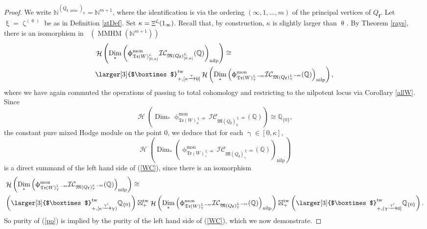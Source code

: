 \documentclass[a4paper,10pt]{amsart}
\newcommand{\ff}{\mathbf{f}}
\newcommand{\Boxtimes}{\mbox{\larger[3]{$\boxtimes$}}}
\newcommand{\WWW}{\mathfrak{Tr}(W)}
\newcommand{\Mst}{\mathfrak{M}}
\newcommand{\ICS}{\mathcal{IC}}
\newcommand{\phim}[1]{\phi^{\mon}_{#1}}
\renewcommand{\theta}{\uptheta}
\renewcommand{\gamma}{\upgamma}
\renewcommand{\zeta}{\upzeta}
\renewcommand{\xi}{\upxi}
\renewcommand{\phi}{\upphi}
\DeclareMathOperator{\sst}{-ss}
\DeclareMathOperator{\nilp}{nilp}
\DeclareMathOperator{\Dim}{Dim}
\DeclareMathOperator{\tw}{tw}
\DeclareMathOperator{\mon}{mon}
\DeclareMathOperator{\Mu}{\Upxi}
\DeclareMathOperator{\MMHM}{MMHM}
\DeclareMathOperator{\princ}{princ}
\DeclareMathOperator{\Ss}{\overline{s}}
\DeclareMathOperator{\Ho}{\mathcal{H}}
\DeclareMathOperator{\Dulf}{\mathcal{D}^{\geq, lf}}
\begin{document}
\begin{proof}
We write $\mathbb{N}^{(Q_{\ff,\princ})_0}=\mathbb{N}^{m+1}$, where the identification is via the ordering $(\infty,1,\ldots,m)$ of the principal vertices of $Q_{\ff}$.  Let $\xi=\zeta_{\Ss}^{(\theta_{\Ss})}$ be as in Definition \ref{ztDef}.  Set $\kappa=\Mu^{\xi}(1_\infty)$.  Recall that, by construction, $\kappa$ is slightly larger than $\theta_{\Ss}$.  By Theorem \ref{rays}, there is an isomorphism in $\Dulf(\MMHM(\mathbb{N}^{m+1}))$
\begin{align}
\label{WC}
&\Ho\left(\Dim_*\left(\phim{\WWW^{\xi}_{[0,\kappa]}}\ICS_{\Mst(Q_{\ff})_{[0,\kappa]}^{\xi}}(\mathbb{Q})\right)_{\nilp}\right)\cong\\&\Boxtimes_{+,[\kappa\xrightarrow{\gamma}0]}^{\tw}\Ho\left(\Dim_*\left(\phim{\WWW_{\gamma}^{\xi\sst}}\ICS_{\Mst(Q_{\ff})_{\gamma}^{\xi\sst}}(\mathbb{Q})\right)_{\nilp}\right),\nonumber
\end{align}
where we have again commuted the operations of passing to total cohomology and restricting to the nilpotent locus via Corollary \ref{allW}.  Since 
\[
\Ho\left(\Dim_*\phim{\WWW_{0}^{\xi\sst}}\ICS_{\Mst(Q_{\ff})_{0}^{\xi\sst}}(\mathbb{Q})\right)\cong\mathbb{Q}_{\{0\}},
\]
the constant pure mixed Hodge module on the point $0$, we deduce that for each $\gamma\in[0,\kappa]$,
\begin{equation}
\label{po}
\Ho\left(\Dim_*\left(\phim{\WWW_{\gamma}^{\xi\sst}}\ICS_{\Mst(Q_{\ff})_{\gamma}^{\xi\sst}}(\mathbb{Q})\right)_{\nilp}\right)
\end{equation} 
is a direct summand of the left hand side of (\ref{WC}), since there is an isomorphism
\begin{align*}
&\Ho\left(\Dim_*\left(\phim{\WWW_{\gamma}^{\xi\sst}}\ICS_{\Mst(Q_{\ff})_{\gamma}^{\xi\sst}}(\mathbb{Q})\right)_{\nilp}\right)\cong \\&\left(\Boxtimes^{\tw}_{+,[\kappa\xrightarrow{\gamma'}\gamma)}\mathbb{Q}_{\{0\}}\right)\boxtimes_+^{\tw}\Ho\left(\Dim_*\left(\phim{\WWW_{\gamma}^{\xi\sst}}\ICS_{\Mst(Q_{\ff})_{\gamma}^{\xi\sst}}(\mathbb{Q})\right)_{\nilp}\right)\boxtimes^{\tw}_+ \left(\Boxtimes^{\tw}_{+,(\gamma\xrightarrow{\gamma'}0]}\mathbb{Q}_{\{0\}}\right).
\end{align*}
So purity of (\ref{po}) is implied by the purity of the left hand side of (\ref{WC}), which we now demonstrate.


\end{proof}
\end{document}
